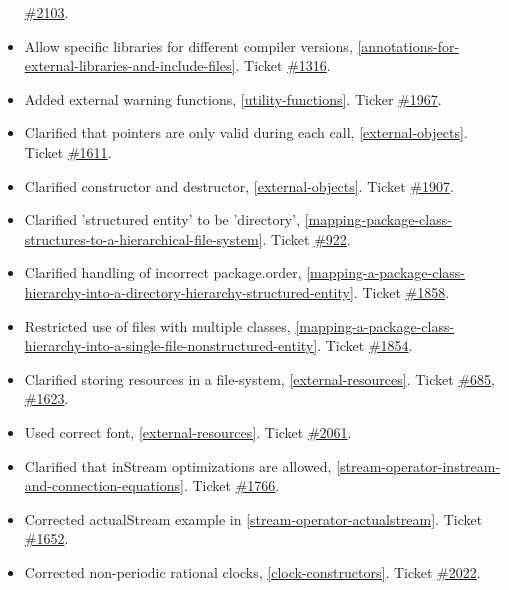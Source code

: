 \documentclass[10pt,a4paper]{report}
\begin{document}
\begin{itemize}
  \href{https://trac.modelica.org/Modelica/ticket/2103}{\#2103}.
\item
  Allow specific libraries for different compiler versions, 
  \ref{annotations-for-external-libraries-and-include-files}. Ticket
  \href{https://trac.modelica.org/Modelica/ticket/1316}{\#1316}.
\item
  Added external warning functions, \ref{utility-functions}. Ticker
  \href{https://trac.modelica.org/Modelica/ticket/1967}{\#1967}.
\item
  Clarified that pointers are only valid during each call, \ref{external-objects}. Ticket
  \href{https://trac.modelica.org/Modelica/ticket/1611}{\#1611}.
\item
  Clarified constructor and destructor, \ref{external-objects}. Ticket
  \href{https://trac.modelica.org/Modelica/ticket/1907}{\#1907}.
\item
  Clarified 'structured entity' to be 'directory', \ref{mapping-package-class-structures-to-a-hierarchical-file-system}.
  Ticket \href{https://trac.modelica.org/Modelica/ticket/922}{\#922}.
\item
  Clarified handling of incorrect package.order, \ref{mapping-a-package-class-hierarchy-into-a-directory-hierarchy-structured-entity}.
  Ticket \href{https://trac.modelica.org/Modelica/ticket/1858}{\#1858}.
\item
  Restricted use of files with multiple classes, \ref{mapping-a-package-class-hierarchy-into-a-single-file-nonstructured-entity}.
  Ticket \href{https://trac.modelica.org/Modelica/ticket/1854}{\#1854}.
\item
  Clarified storing resources in a file-system, \ref{external-resources}. Ticket
  \href{https://trac.modelica.org/Modelica/ticket/685}{\#685},
  \href{https://trac.modelica.org/Modelica/ticket/1623}{\#1623}.
\item
  Used correct font, \ref{external-resources}. Ticket
  \href{https://trac.modelica.org/Modelica/ticket/2061}{\#2061}.
\item
  Clarified that inStream optimizations are allowed, \ref{stream-operator-instream-and-connection-equations}.
  Ticket \href{https://trac.modelica.org/Modelica/ticket/1766}{\#1766}.
\item
  Corrected actualStream example in \ref{stream-operator-actualstream}. Ticket
  \href{https://trac.modelica.org/Modelica/ticket/1652}{\#1652}.
\item
  Corrected non-periodic rational clocks, \ref{clock-constructors}. Ticket
  \href{https://trac.modelica.org/Modelica/ticket/2022}{\#2022}.

\end{itemize}
\end{document}
